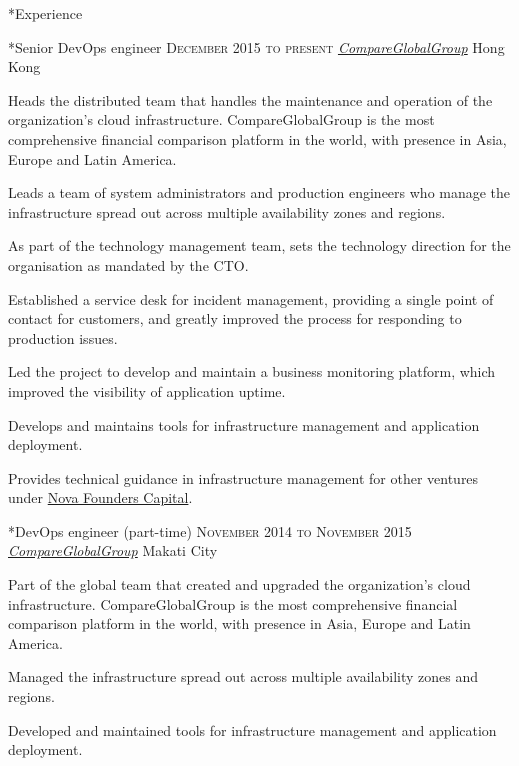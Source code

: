 \documentclass[10pt, a4paper, final]{article}
\begin{document}
\begin{section}*{Experience}
  \begin{subsection}*{Senior DevOps engineer \hfill\textsc{December 2015 to present}}
    \href{http://www.compareglobalgroup.com}{\textit{CompareGlobalGroup}} \hfill Hong Kong
    \vspace{1em}

    Heads the distributed team that handles the maintenance and operation of the organization's cloud infrastructure. CompareGlobalGroup is the most comprehensive financial comparison platform in the world, with presence in Asia, Europe and Latin America.
    \vspace{1em}
    \begin{compactitem}
      \item Leads a team of system administrators and production engineers who manage the infrastructure spread out across multiple availability zones and regions.
      \item As part of the technology management team, sets the technology direction for the organisation as mandated by the CTO.
      \item Established a service desk for incident management, providing a single point of contact for customers, and greatly improved the process for responding to production issues.
      \item Led the project to develop and maintain a business monitoring platform, which improved the visibility of application uptime.
      \item Develops and maintains tools for infrastructure management and application deployment.
      \item Provides technical guidance in infrastructure management for other ventures under \href{http://www.novafounders.com/}{Nova Founders Capital}.
      
    \end{compactitem}
  \end{subsection}
  \vspace{1.5em}

  \begin{subsection}*{DevOps engineer (part-time) \hfill\textsc{November 2014 to November 2015}}
    \href{http://www.compareglobalgroup.com}{\textit{CompareGlobalGroup}} \hfill Makati City
    \vspace{1em}

    Part of the global team that created and upgraded the organization's cloud infrastructure. CompareGlobalGroup is the most comprehensive financial comparison platform in the world, with presence in Asia, Europe and Latin America.
    \vspace{1em}
    \begin{compactitem}
      \item Managed the infrastructure spread out across multiple availability zones and regions.
      \item Developed and maintained tools for infrastructure management and application deployment.
      

\end{compactitem}
\end{subsection}
\end{section}
\end{document}
